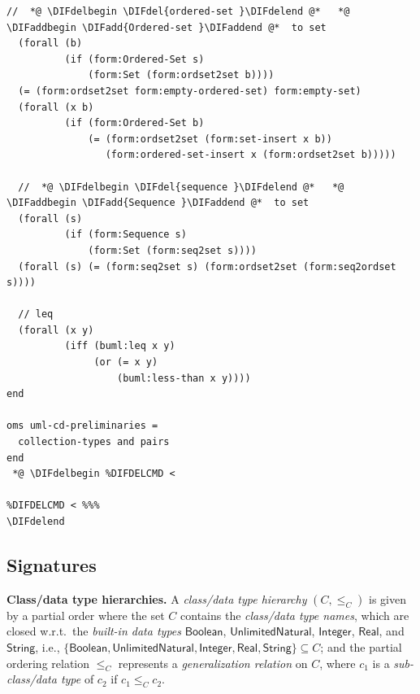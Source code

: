 \documentclass[10pt,fleqn,final]{scrreprt}
\newenvironment{definitions}[0]{\medskip }{}
\newcommand{\uml}[1]{\textsf{#1}}
\providecommand{\DIFadd}[1]{{\protect\color{blue}\uwave{#1}}} %
\providecommand{\DIFdel}[1]{{\protect\color{red}\sout{#1}}}                      %
\providecommand{\DIFaddbegin}{} %
\providecommand{\DIFaddend}{} %
\providecommand{\DIFdelbegin}{} %
\providecommand{\DIFdelend}{} %
\begin{document}
\begin{definitions}
\begin{lstlisting}[language=clif,morekeywords={then,with,logic,oms,end},mathescape]
  //  *@ \DIFdelbegin \DIFdel{ordered-set }\DIFdelend @*   *@ \DIFaddbegin \DIFadd{Ordered-set }\DIFaddend @*  to set
  (forall (b)
          (if (form:Ordered-Set s)
              (form:Set (form:ordset2set b))))
  (= (form:ordset2set form:empty-ordered-set) form:empty-set)
  (forall (x b)
          (if (form:Ordered-Set b)
              (= (form:ordset2set (form:set-insert x b))
                 (form:ordered-set-insert x (form:ordset2set b)))))

  //  *@ \DIFdelbegin \DIFdel{sequence }\DIFdelend @*   *@ \DIFaddbegin \DIFadd{Sequence }\DIFaddend @*  to set
  (forall (s)
          (if (form:Sequence s)
              (form:Set (form:seq2set s))))
  (forall (s) (= (form:seq2set s) (form:ordset2set (form:seq2ordset s))))

  // leq
  (forall (x y)
          (iff (buml:leq x y)
               (or (= x y)
                   (buml:less-than x y))))
end

oms uml-cd-preliminaries =
  collection-types and pairs
end
 *@ \DIFdelbegin %DIFDELCMD < 

%DIFDELCMD < %%%
\DIFdelend \end{lstlisting}


\DIFdelbegin %
\DIFdelend \DIFaddbegin \subsection{Signatures}
\DIFaddend 

\DIFdelbegin %
\DIFdelend \textbf{Class/data type hierarchies.}  A \emph{class/data type
  hierarchy} $(C, {\leq_C})$
is given by a partial order where the set $C$
contains the \emph{class/data type names}, which are closed w.r.t.\ the
\emph{built-in data types} $\mathsf{Boolean}$,
$\mathsf{UnlimitedNatural}$,
$\mathsf{Integer}$,
$\mathsf{Real}$,
and $\mathsf{String}$,
i.e.,
$\{ \mathsf{Boolean}, \mathsf{UnlimitedNatural},\allowbreak
\mathsf{Integer}, \mathsf{Real}, \mathsf{String} \} \subseteq C$;
and the partial ordering relation $\leq_C$ represents a
\emph{generalization relation} on $C$, where $c_1$ is a
\emph{sub-class/data type} of $c_2$ if $c_1 \leq_C c_2$.


\end{definitions}
\end{document}
